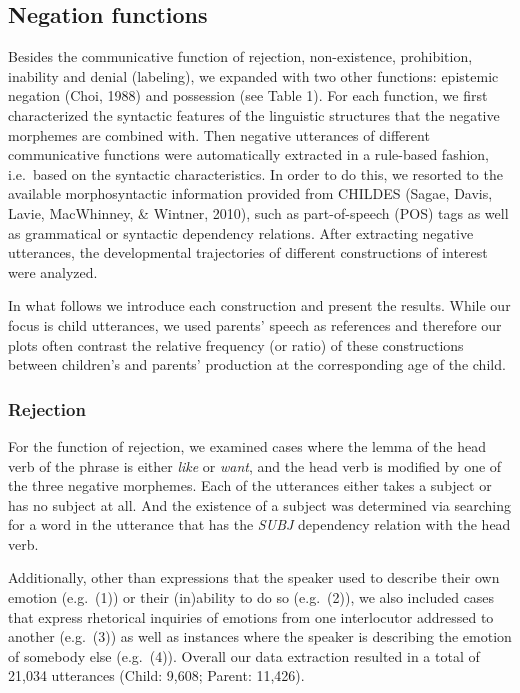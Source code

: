 \documentclass[10pt, letterpaper]{article}
\begin{document}
\hypertarget{negation-functions}{%
\subsection{Negation functions}\label{negation-functions}}

Besides the communicative function of rejection, non-existence,
prohibition, inability and denial (labeling), we expanded with two other
functions: epistemic negation (Choi, 1988) and possession (see Table 1).
For each function, we first characterized the syntactic features of the
linguistic structures that the negative morphemes are combined with.
Then negative utterances of different communicative functions were
automatically extracted in a rule-based fashion, i.e.~based on the
syntactic characteristics. In order to do this, we resorted to the
available morphosyntactic information provided from CHILDES (Sagae,
Davis, Lavie, MacWhinney, \& Wintner, 2010), such as part-of-speech
(POS) tags as well as grammatical or syntactic dependency relations.
After extracting negative utterances, the developmental trajectories of
different constructions of interest were analyzed.

In what follows we introduce each construction and present the results.
While our focus is child utterances, we used parents' speech as
references and therefore our plots often contrast the relative frequency
(or ratio) of these constructions between children's and parents'
production at the corresponding age of the child.

\hypertarget{rejection}{%
\subsubsection{Rejection}\label{rejection}}

For the function of rejection, we examined cases where the lemma of the
head verb of the phrase is either \emph{like} or \emph{want}, and the
head verb is modified by one of the three negative morphemes. Each of
the utterances either takes a subject or has no subject at all. And the
existence of a subject was determined via searching for a word in the
utterance that has the \emph{SUBJ} dependency relation with the head
verb.

Additionally, other than expressions that the speaker used to describe
their own emotion (e.g.~(1)) or their (in)ability to do so (e.g.~(2)),
we also included cases that express rhetorical inquiries of emotions
from one interlocutor addressed to another (e.g.~(3)) as well as
instances where the speaker is describing the emotion of somebody else
(e.g.~(4)). Overall our data extraction resulted in a total of 21,034
utterances (Child: 9,608; Parent: 11,426).
\end{document}
